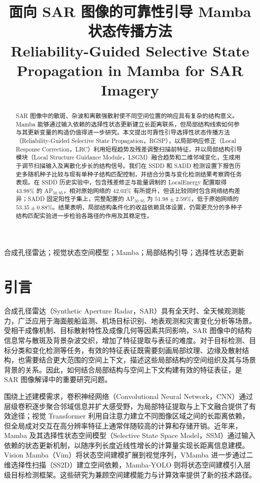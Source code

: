 \documentclass[journal]{IEEEtran}
\title{\LARGE 面向 SAR 图像的可靠性引导 Mamba 状态传播方法\\[0.5em]
{\large Reliability-Guided Selective State Propagation in Mamba for SAR Imagery}}
\author{}
\begin{document}
\maketitle
\begin{abstract}
SAR 图像中的散斑、杂波和离散强散射使不同空间位置的响应具有复杂的结构意义。Mamba 能够通过输入依赖的选择性状态更新建立长距离联系，但局部结构线索如何参与其更新变量的构造仍值得进一步研究。本文提出可靠性引导选择性状态传播方法（Reliability-Guided Selective State Propagation，RGSP），以局部响应修正（Local Response Correction，LRC）利用短程趋势及残差调整扫描前特征，并以局部结构引导模块（Local Structure Guidance Module，LSGM）融合趋势和二维邻域变化，生成用于调节扫描输入及离散化步长的结构信号。我们在 SSDD 和 SADD 检测设置下报告历史多随机种子比较与现有单种子结构匹配控制，并结合分类与变化检测结果考察跨任务表现。在 SSDD 历史实验中，包含残差修正与能量调制的 LocalEnergy 配置取得 $43.98\%$ 的 AP$_{50:95}$，相对原始网络的 $42.03\%$ 有所提升，但该比较同时包含网络结构差异；SADD 固定阳性子集上，完整配置的 AP$_{50:95}$ 为 $51.98\pm2.59\%$，低于原始网络的 $53.35\pm0.88\%$。结果表明，局部结构条件化的收益依赖具体设置，仍需更充分的多种子结构匹配实验进一步检验各路径的作用及其稳定性。
\end{abstract}

\begin{IEEEkeywords}
合成孔径雷达；视觉状态空间模型；Mamba；局部结构引导；选择性状态更新
\end{IEEEkeywords}

\section{引言}
\label{sec:intro}

合成孔径雷达（Synthetic Aperture Radar，SAR）具有全天时、全天候观测能力，广泛应用于海面舰船监测、机场目标识别、地表观测和灾害变化分析等场景。受相干成像机制、目标散射特性及成像几何等因素共同影响，SAR 图像中的结构信息常与散斑及背景杂波交织，增加了特征提取与表征的难度。对于目标检测、目标分类和变化检测等任务，有效的特征表征既需要刻画局部纹理、边缘及散射结构，也需要结合更大范围的空间上下文，描述这些局部结构的空间组织及其与场景背景的关系。因此，如何结合局部结构与空间上下文构建有效的特征表征，是 SAR 图像解译中的重要研究问题。

围绕上述建模需求，卷积神经网络（Convolutional Neural Network，CNN）通过层级卷积逐步聚合邻域信息并扩大感受野，为局部特征提取与上下文融合提供了有效途径\cite{resnet2015}；视觉 Transformer 利用自注意力建立不同图像区域之间的长距离依赖\cite{vit2020}，但全局成对交互在高分辨率特征上通常伴随较高的计算和存储开销。近年来，Mamba 及其选择性状态空间模型（Selective State Space Model，SSM）通过输入依赖的状态更新机制，以随序列长度近线性增长的计算量实现长距离信息建模\cite{mamba2023}。Vision Mamba（Vim）将状态空间建模扩展到视觉序列\cite{vim2024}，VMamba 进一步通过二维选择性扫描（SS2D）建立空间依赖\cite{vmamba2024}，Mamba-YOLO 则将状态空间建模引入层级目标检测框架\cite{mambayolo2024}。这些研究为兼顾空间建模能力与计算效率提供了新的技术路径。
\end{document}
